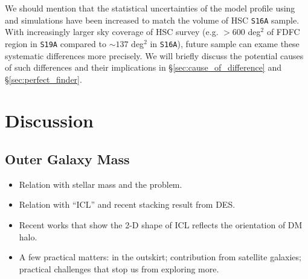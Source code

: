 \documentclass[a4paper,fleqn,usenatbib]{mnras}
\begin{document}
    We should mention that the statistical uncertainties of the model \dsigma{} profile
    using  and \smdpl{} simulations have been increased to match the volume of
    HSC \texttt{S16A} sample.
    With increasingly larger sky coverage of HSC survey (e.g. $>600$ deg$^2$ of FDFC region
    in \texttt{S19A} compared to $\sim 137$ deg$^2$ in \texttt{S16A}), future sample can
    exame these systematic differences more precisely.
    We will briefly discuss the potential causes of such differences and their implications
    in \S \ref{sec:cause_of_difference} and \S \ref{sec:perfect_finder}.

\section{Discussion}
    \label{sec:discussion}
    
\subsection{Outer Galaxy Mass}
    \label{sec:outer_mstar}




    \begin{itemize}

        \item Relation with \exsitu{} stellar mass and the problem.

        \item Relation with ``ICL'' \mstar{} and recent stacking result from DES.
        
        \item Recent works that show the 2-D shape of ICL reflects the orientation of DM halo.
        
        \item A few practical matters: \mlratio{} in the outskirt; contribution from satellite 
            galaxies; practical challenges that stop us from exploring more.

    \end{itemize}
\end{document}
